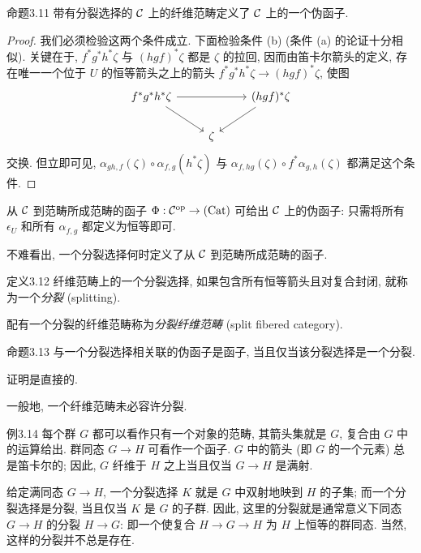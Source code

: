 \begin{origstatement}{命题}{3.11}\label{ch03:prop311}
带有分裂选择的 $\mathcal C$ 上的纤维范畴定义了 $\mathcal C$ 上的一个伪函子.
\end{origstatement}
\begin{proof}
我们必须检验这两个条件成立. 下面检验条件 (b) (条件 (a) 的论证十分相似). 关键在于, $f^*g^*h^*\zeta$ 与 $(hgf)^*\zeta$ 都是 $\zeta$ 的拉回, 因而由笛卡尔箭头的定义, 存在唯一一个位于 $U$ 的恒等箭头之上的箭头 $f^*g^*h^*\zeta\to(hgf)^*\zeta$, 使图
\[
\begin{tikzcd}
f^*g^*h^*\zeta\arrow[rr]\arrow[dr]&&(hgf)^*\zeta\arrow[dl]\\
&\zeta&
\end{tikzcd}
\]
交换. 但立即可见, $\alpha_{gh,f}(\zeta)\circ\alpha_{f,g}(h^*\zeta)$ 与 $\alpha_{f,hg}(\zeta)\circ f^*\alpha_{g,h}(\zeta)$ 都满足这个条件.
\end{proof}

从 $\mathcal C$ 到范畴所成范畴的函子 $\Phi:\mathcal C^{\mathrm{op}}\to(\mathrm{Cat})$ 可给出 $\mathcal C$ 上的伪函子: 只需将所有 $\epsilon_U$ 和所有 $\alpha_{f,g}$ 都定义为恒等即可.

不难看出, 一个分裂选择何时定义了从 $\mathcal C$ 到范畴所成范畴的函子.

\begin{origstatement}{定义}{3.12}\label{ch03:def312}
纤维范畴上的一个分裂选择, 如果包含所有恒等箭头且对复合封闭, 就称为一个\emph{分裂} (splitting).

配有一个分裂的纤维范畴称为\emph{分裂纤维范畴} (split fibered category).
\end{origstatement}

\begin{origstatement}{命题}{3.13}\label{ch03:prop313}
与一个分裂选择相关联的伪函子是函子, 当且仅当该分裂选择是一个分裂.
\end{origstatement}

证明是直接的.

一般地, 一个纤维范畴未必容许分裂.

\begin{origstatement}{例}{3.14}\label{ch03:ex314}
每个群 $G$ 都可以看作只有一个对象的范畴, 其箭头集就是 $G$, 复合由 $G$ 中的运算给出. 群同态 $G\to H$ 可看作一个函子. $G$ 中的箭头 (即 $G$ 的一个元素) 总是笛卡尔的; 因此, $G$ 纤维于 $H$ 之上当且仅当 $G\to H$ 是满射.

给定满同态 $G\to H$, 一个分裂选择 $K$ 就是 $G$ 中双射地映到 $H$ 的子集; 而一个分裂选择是分裂, 当且仅当 $K$ 是 $G$ 的子群. 因此, 这里的分裂就是通常意义下同态 $G\to H$ 的分裂 $H\to G$: 即一个使复合 $H\to G\to H$ 为 $H$ 上恒等的群同态. 当然, 这样的分裂并不总是存在.
\end{origstatement}

